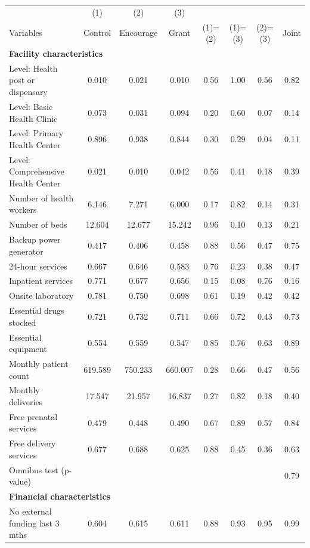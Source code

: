 \small\begin{tabular}{lccccccc} 
\toprule 
                       &    (1)        &   (2)         &   (3)         &                       &                       &                       &  \\
Variables      & Control       & Encourage     & Grant         & (1)=(2)       & (1)=(3)       & (2)=(3)       & Joint\\
\midrule 
\multicolumn{8}{p{0.99\textwidth}}{\textbf{Facility characteristics}} \\Level: Health post or dispensary & 0.010 & 0.021  & 0.010 & 0.56 & 1.00 & 0.56 & 0.82\\
Level: Basic Health Clinic & 0.073 & 0.031  & 0.094 & 0.20 & 0.60 & 0.07 & 0.14\\
Level: Primary Health Center & 0.896 & 0.938  & 0.844 & 0.30 & 0.29 & 0.04 & 0.11\\
Level: Comprehensive Health Center & 0.021 & 0.010  & 0.042 & 0.56 & 0.41 & 0.18 & 0.39\\
Number of health workers & 6.146 & 7.271  & 6.000 & 0.17 & 0.82 & 0.14 & 0.31\\
Number of beds & 12.604 & 12.677  & 15.242 & 0.96 & 0.10 & 0.13 & 0.21\\
Backup power generator & 0.417 & 0.406  & 0.458 & 0.88 & 0.56 & 0.47 & 0.75\\
24-hour services & 0.667 & 0.646  & 0.583 & 0.76 & 0.23 & 0.38 & 0.47\\
Inpatient services & 0.771 & 0.677  & 0.656 & 0.15 & 0.08 & 0.76 & 0.16\\
Onsite laboratory & 0.781 & 0.750  & 0.698 & 0.61 & 0.19 & 0.42 & 0.42\\
Essential drugs stocked & 0.721 & 0.732  & 0.711 & 0.66 & 0.72 & 0.43 & 0.73\\
Essential equipment & 0.554 & 0.559  & 0.547 & 0.85 & 0.76 & 0.63 & 0.89\\
Monthly patient count & 619.589 & 750.233  & 660.007 & 0.28 & 0.66 & 0.47 & 0.56\\
Monthly deliveries & 17.547 & 21.957  & 16.837 & 0.27 & 0.82 & 0.18 & 0.40\\
Free prenatal services & 0.479 & 0.448  & 0.490 & 0.67 & 0.89 & 0.57 & 0.84\\
Free delivery services & 0.677 & 0.688  & 0.625 & 0.88 & 0.45 & 0.36 & 0.63\\
 Omnibus test (p-value) &   &   &  &  &  &  & 0.79  \\
\midrule 
\multicolumn{8}{p{0.99\textwidth}}{\textbf{Financial characteristics}} \\No external funding last 3 mths & 0.604 & 0.615  & 0.611 & 0.88 & 0.93 & 0.95 & 0.99\\

\end{tabular}
